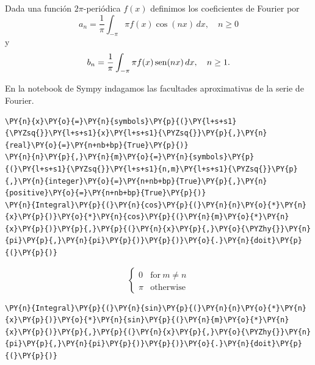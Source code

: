 \begin{definicion}{}
Dada una función $2\pi$-periódica $f(x)$ definimos los coeficientes de Fourier por
\begin{equation}
a_n=\frac{1}{\pi} \int_{-\pi}{\pi} f(x)\cos(nx)\,dx,\quad n\geq 0
\end{equation}
y 
\begin{equation}
b_n=\frac{1}{\pi} \int_{-\pi}{\pi} f(x)\operatorname{sen}(nx)\,dx,\quad n\geq 1.
\end{equation}
\end{definicion}

En la notebook de Sympy indagamos las facultades aproximativas de la serie de Fourier.
    \begin{tcolorbox}[breakable, size=fbox, boxrule=1pt, pad at break*=1mm,colback=cellbackground, colframe=cellborder]
\begin{Verbatim}[commandchars=\\\{\}]
\PY{n}{x}\PY{o}{=}\PY{n}{symbols}\PY{p}{(}\PY{l+s+s1}{\PYZsq{}}\PY{l+s+s1}{x}\PY{l+s+s1}{\PYZsq{}}\PY{p}{,}\PY{n}{real}\PY{o}{=}\PY{n+nb+bp}{True}\PY{p}{)}
\PY{n}{n}\PY{p}{,}\PY{n}{m}\PY{o}{=}\PY{n}{symbols}\PY{p}{(}\PY{l+s+s1}{\PYZsq{}}\PY{l+s+s1}{n,m}\PY{l+s+s1}{\PYZsq{}}\PY{p}{,}\PY{n}{integer}\PY{o}{=}\PY{n+nb+bp}{True}\PY{p}{,}\PY{n}{positive}\PY{o}{=}\PY{n+nb+bp}{True}\PY{p}{)}
\PY{n}{Integral}\PY{p}{(}\PY{n}{cos}\PY{p}{(}\PY{n}{n}\PY{o}{*}\PY{n}{x}\PY{p}{)}\PY{o}{*}\PY{n}{cos}\PY{p}{(}\PY{n}{m}\PY{o}{*}\PY{n}{x}\PY{p}{)}\PY{p}{,}\PY{p}{(}\PY{n}{x}\PY{p}{,}\PY{o}{\PYZhy{}}\PY{n}{pi}\PY{p}{,}\PY{n}{pi}\PY{p}{)}\PY{p}{)}\PY{o}{.}\PY{n}{doit}\PY{p}{(}\PY{p}{)}
\end{Verbatim}
\end{tcolorbox}
 
            
    
    $$\begin{cases} 0 & \text{for}\: m \neq n \\\pi & \text{otherwise} \end{cases}$$

    

    \begin{tcolorbox}[breakable, size=fbox, boxrule=1pt, pad at break*=1mm,colback=cellbackground, colframe=cellborder]
\begin{Verbatim}[commandchars=\\\{\}]
\PY{n}{Integral}\PY{p}{(}\PY{n}{sin}\PY{p}{(}\PY{n}{n}\PY{o}{*}\PY{n}{x}\PY{p}{)}\PY{o}{*}\PY{n}{sin}\PY{p}{(}\PY{n}{m}\PY{o}{*}\PY{n}{x}\PY{p}{)}\PY{p}{,}\PY{p}{(}\PY{n}{x}\PY{p}{,}\PY{o}{\PYZhy{}}\PY{n}{pi}\PY{p}{,}\PY{n}{pi}\PY{p}{)}\PY{p}{)}\PY{o}{.}\PY{n}{doit}\PY{p}{(}\PY{p}{)}
\end{Verbatim}
\end{tcolorbox}
 
